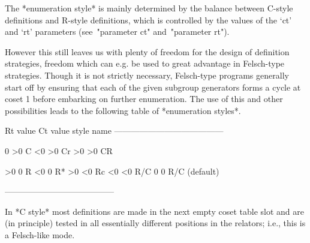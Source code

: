 \endlist

The *enumeration  style* is mainly  determined by the  balance between
C-style definitions  and R-style  definitions, which is  controlled by
the  values  of  the  `ct'  and `rt'  parameters  (see~"parameter  ct"
and~"parameter rt").

However this still leaves us with  plenty of freedom for the design of
definition  strategies,  freedom which  can  e.g.   be  used to  great
advantage  in  Felsch-type  strategies.   Though it  is  not  strictly
necessary, Felsch-type  programs generally start off  by ensuring that
each of the given subgroup generators  forms a cycle at coset 1 before
embarking  on   further  enumeration.  The  use  of   this  and  other
possibilities leads to the following table of *enumeration styles*.


\begintt
Rt value     Ct value     style name
---------------------------------------

   0           >0         C
  <0           >0         Cr
  >0           >0         CR

  >0            0         R
  <0            0         R*
  >0           <0         Rc
  <0           <0         R/C
   0            0         R/C (default)

---------------------------------------
\endtt

In *C style*  most definitions are made in the  next empty coset table
slot  and  are (in  principle)  tested  in  all essentially  different
positions in the relators; i.e., this is a Felsch-like mode.

